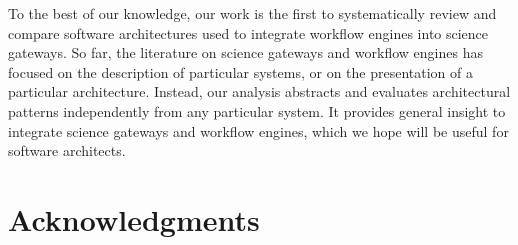 \documentclass[preprint,3p,twocolumn]{elsarticle}
\newcommand{\note}[2]{\pdfmargincomment[color=yellow,author=#1,open=true]{#2}}
\newcommand{\closednote}[4]{} %
\begin{document}
To the best of our knowledge, our work is the first to systematically
review and compare software architectures used to integrate workflow
engines into science gateways.\closednote{Naj}{instead of its kind,
  explain what kind it is, e.g. systematic review of all
  ...}{Tristan}{Done.} So far, the literature on science gateways and
workflow engines has focused on the description of particular systems,
or on the presentation of a particular architecture.  Instead, our
analysis abstracts and evaluates architectural patterns independently
from any particular system. It provides general insight to integrate
science gateways and workflow engines, which we hope will be useful
for software architects.


\section{Acknowledgments}
\end{document}
